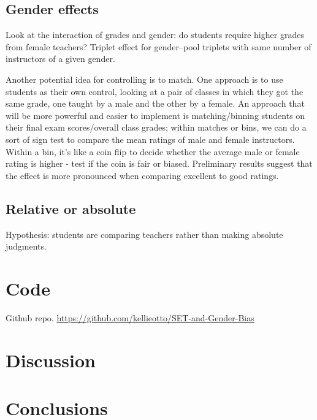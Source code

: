\documentclass[12pt]{article}
\begin{document}
\subsection{Gender effects}
Look at the interaction of grades and gender: 
do students require higher grades from female teachers?
Triplet effect for gender--pool triplets with same number of instructors of a given gender.

Another potential idea for controlling is to match. 
One approach is to use students as their own control, looking at a pair of classes in which they got the same grade, one taught by a male and the other by a female. 
An approach that will be more powerful and easier to implement is matching/binning students on their final exam scores/overall class grades; within matches or bins, we can do a sort of sign test to compare the mean ratings of male and female instructors. 
Within a bin, it's like a coin flip to decide whether the average male or 
female rating is higher - test if the coin is fair or biased. 
Preliminary results suggest that the effect is more pronounced when comparing excellent to good ratings.

\subsection{Relative or absolute}
Hypothesis: students are comparing teachers rather than making absolute judgments.


%

\section{Code}
Github repo. \url{https://github.com/kellieotto/SET-and-Gender-Bias}

\section{Discussion}

\section{Conclusions}
\end{document}
